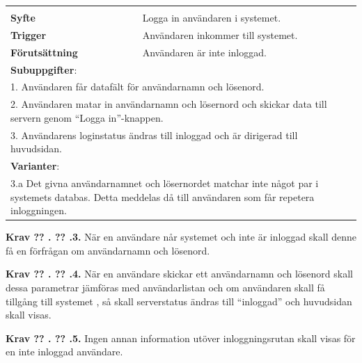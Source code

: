 \documentclass[a4paper]{article}
\newcommand\getcurrentref[1]{%
 \ifnumequal{\value{#1}}{0}
  {??}
  {\the\value{#1}}%
}
\newcommand\requirement[2]{
	\numberedrow{Krav}{#1}{#2}
}
\newcommand\scenario[2] {
	\numberedrow{Scenario}{#1}{#2}
}
\newcommand\numberedrow[3]{
	\noindent
	\textbf{#1 \getcurrentref{section}.\getcurrentref{subsection}.#2.} #3
	
}
\begin{document}

\begin{table}[H]
\begin{tabular}{ | p{2cm} p{11cm} | }
   
        \hline
	\multicolumn{2}{|p{13cm}|}{ \indent\scenario{1}} \\
    \textbf{Syfte} & Logga in användaren i systemet.\\
    \textbf{Trigger} & Användaren inkommer till systemet. \\
    \textbf{Förutsättning} & Användaren är inte inloggad.\\
    \hline

	\multicolumn{2}{|p{13cm}|}{ \textbf{Subuppgifter}:} \\

	\multicolumn{2}{|p{13cm}|}{ 1. Användaren får datafält för användarnamn och lösenord.}\\
	\multicolumn{2}{|p{13cm}|}{ 2. Användaren matar in användarnamn och lösernord och skickar data till servern genom ``Logga in''-knappen.} \\	
	\multicolumn{2}{|p{13cm}|}{ 3. Användarens loginstatus ändras till inloggad och är dirigerad till huvudsidan. }\\ \hline
    \multicolumn{2}{|p{13cm}|}{ \textbf{Varianter}: }\\
	\multicolumn{2}{|p{13cm}|}{ 3.a Det givna användarnamnet och lösernordet matchar inte något par i systemets databas. Detta meddelas då till användaren som får repetera inloggningen.}\\
	    \hline


\end{tabular}
\end{table}

\requirement{3}{När en användare når systemet och inte är inloggad skall denne få en förfrågan om användarnamn och lösenord.}
\requirement{4}{När en användare skickar ett användarnamn och lösenord skall dessa parametrar jämföras med användarlistan och om användaren skall få tillgång till systemet , så skall serverstatus ändras till ``inloggad'' och huvudsidan skall visas.}
\requirement{5}{Ingen annan information utöver inloggningsrutan skall visas för en inte inloggad användare.}
\end{document}
